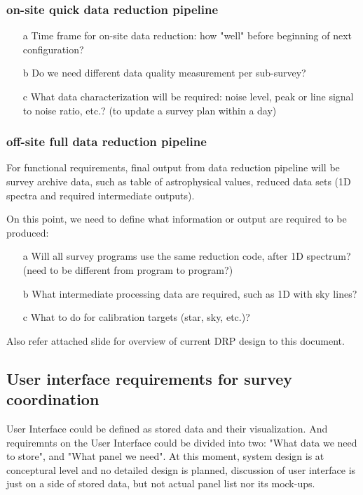 \documentclass[a4paper,notitlepage]{article}
\begin{document}
\subsubsection{on-site quick data reduction pipeline}

\begin{enumerate}
  \item[a] Time frame for on-site data reduction: 
    how "well" before beginning of next configuration?
  \item[b] Do we need different data quality measurement per sub-survey? 
  \item[c] What data characterization will be required: 
    noise level, peak or line signal to noise ratio, etc.?
    (to update a survey plan within a day)
\end{enumerate}


\subsubsection{off-site full data reduction pipeline}


For functional requirements, final output from data reduction pipeline will 
be survey archive data, such as table of astrophysical values, reduced data 
sets (1D spectra and required intermediate outputs). 

On this point, we need to define what information or output are required to 
be produced: 
\begin{enumerate}
  \item[a] Will all survey programs use the same reduction code, after 1D spectrum?
    (need to be different from program to program?)
  \item[b] What intermediate processing data are required, such as 1D with sky lines?
  \item[c] What to do for calibration targets (star, sky, etc.)?
\end{enumerate}

Also refer attached slide for overview of current DRP design to this document. 


\subsection{User interface requirements for survey coordination}

User Interface could be defined as stored data and their visualization. And 
requiremnts on the User Interface could be divided into two: 
"What data we need to store", and "What panel we need".
At this moment, system design is at conceptural level and no detailed design 
is planned, discussion of user interface is just on a side of stored data, but 
not actual panel list nor its mock-ups. 
\end{document}
